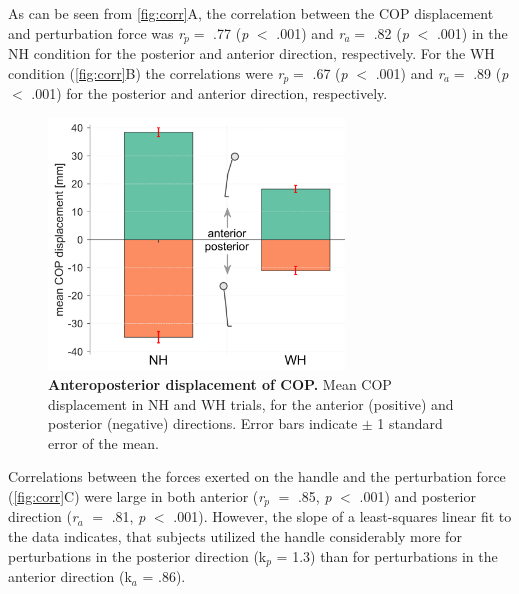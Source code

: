 \clearpage
As can be seen from \FigureAbbr \ref{fig:corr}A, the correlation between the COP displacement and perturbation force was \textit{r}$_{p} =$ .77 (\textit{p} $<$ .001) and \textit{r}$_{a} =$ .82 (\textit{p} $<$ .001) in the NH condition for the posterior and anterior direction, respectively. For the WH condition (\FigureAbbr \ref{fig:corr}B) the correlations were \textit{r}$_{p} =$ .67 (\textit{p} $<$ .001) and \textit{r}$_{a} =$ .89 (\textit{p} $<$ .001) for the posterior and anterior direction, respectively.

\begin{figure}[!htb]
	\centering
	\includegraphics[width=0.7\textwidth]{Jernej/figures/cop}
	\caption{\textbf{Anteroposterior displacement of COP. }Mean COP displacement in NH and WH trials, for the anterior (positive) and posterior (negative) directions. Error bars indicate $\pm$ 1 standard error of the mean.
	}
	\label{fig:cop}
\end{figure}

Correlations between the forces exerted on the handle and the perturbation force (\FigureAbbr \ref{fig:corr}C) were large in both anterior (\textit{r}$_{p}$ $=$ .85, \textit{p} $<$ .001) and posterior direction (\textit{r}$_{a}$ $=$ .81, \textit{p} $<$ .001). However, the slope of a least-squares linear fit to the data indicates, that subjects utilized the handle considerably more for perturbations in the posterior direction (k$_{p}$ = 1.3) than for perturbations in the anterior direction (k$_{a}$ = .86).

